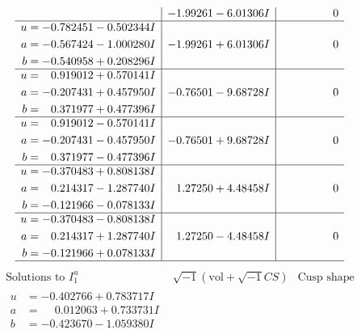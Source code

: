 \documentclass[1p]{elsarticle_modified}
\theoremstyle{definition}
\newcommand{\I}{\sqrt{-1}}
\begin{document}
$$\begin{array}{c|c|c}
 & -1.99261 - 6.01306 I & \phantom{-0.000000 } 0 \\ \hline\begin{aligned}
u &= -0.782451 - 0.502344 I \\
a &= -0.567424 - 1.000280 I \\
b &= -0.540958 + 0.208296 I\end{aligned}
 & -1.99261 + 6.01306 I & \phantom{-0.000000 } 0 \\ \hline\begin{aligned}
u &= \phantom{-}0.919012 + 0.570141 I \\
a &= -0.207431 + 0.457950 I \\
b &= \phantom{-}0.371977 + 0.477396 I\end{aligned}
 & -0.76501 - 9.68728 I & \phantom{-0.000000 } 0 \\ \hline\begin{aligned}
u &= \phantom{-}0.919012 - 0.570141 I \\
a &= -0.207431 - 0.457950 I \\
b &= \phantom{-}0.371977 - 0.477396 I\end{aligned}
 & -0.76501 + 9.68728 I & \phantom{-0.000000 } 0 \\ \hline\begin{aligned}
u &= -0.370483 + 0.808138 I \\
a &= \phantom{-}0.214317 - 1.287740 I \\
b &= -0.121966 - 0.078133 I\end{aligned}
 & \phantom{-}1.27250 + 4.48458 I & \phantom{-0.000000 } 0 \\ \hline\begin{aligned}
u &= -0.370483 - 0.808138 I \\
a &= \phantom{-}0.214317 + 1.287740 I \\
b &= -0.121966 + 0.078133 I\end{aligned}
 & \phantom{-}1.27250 - 4.48458 I & \phantom{-0.000000 } 0\\
 \hline 
 \end{array}$$\newpage$$\begin{array}{c|c|c}  
\text{Solutions to }I^u_{1}& \I (\text{vol} + \sqrt{-1}CS) & \text{Cusp shape}\\
 \hline 
\begin{aligned}
u &= -0.402766 + 0.783717 I \\
a &= \phantom{-}0.012063 + 0.733731 I \\
b &= -0.423670 - 1.059380 I\end{aligned}

\end{array}$$
\end{document}
